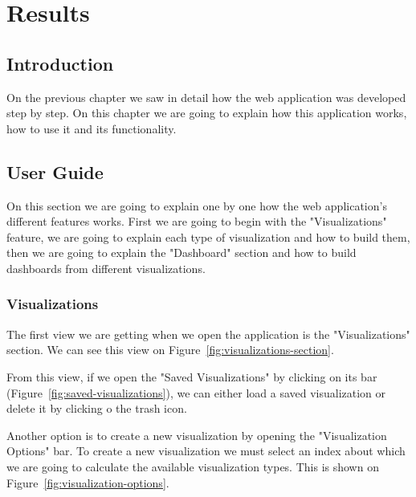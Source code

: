 \documentclass[a4paper, 12pt, english]{book}
\begin{document}



\cleardoublepage
\chapter{Results}
\section{Introduction}
\label{sec:results-introduction}
On the previous chapter we saw in detail how the web application was developed step by step. On this chapter we are going to explain how this application works, how to use it and its functionality.

\section{User Guide}
\label{sec:results-user-guide}
On this section we are going to explain one by one how the web application's different features works. First we are going to begin with the "Visualizations" feature, we are going to explain each type of visualization and how to build them, then we are going to explain the "Dashboard" section and how to build dashboards from different visualizations.

\subsection{Visualizations}
\label{sec:results-visualizations}
The first view we are getting when we open the application is the "Visualizations" section. We can see this view on Figure~\ref{fig:visualizations-section}.

From this view, if we open the "Saved Visualizations" by clicking on its bar (Figure~\ref{fig:saved-visualizations}),  we can either load a saved visualization or delete it by clicking o the trash icon.

Another option is to create a new visualization by opening the "Visualization Options" bar. To create a new visualization we must select an index about which we are going to calculate the available visualization types. This is shown on Figure~\ref{fig:visualization-options}.
\end{document}
